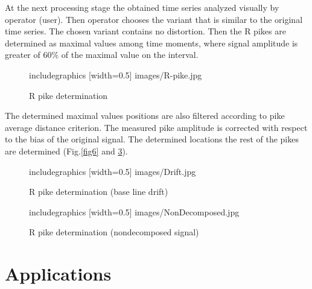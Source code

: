 \documentclass[runningheads]{AIIT}
\begin{document}
At the next processing stage the obtained time series analyzed visually by operator (user).  Then operator chooses the variant that is similar to the original time series.  The chosen variant contains no distortion.  Then the R pikes are determined as maximal values among time moments, where signal amplitude is greater of 60\% of the maximal value on the interval.

\begin{figure}[htb]
  \centering
    includegraphics [width=0.5\linewidth] {images/R-pike.jpg}
  \caption{R pike determination}
  \label{fig:determ-R}
\end{figure}
The determined maximal values positions are also filtered according to pike average distance criterion.  The measured pike amplitude is corrected with respect to the bias of the original signal.  The determined locations the rest of the pikes are determined (Fig.\ref{fig6} and \ref{fig:fig7}).

\begin{figure}[htb]
  \centering
    includegraphics [width=0.5\linewidth] {images/Drift.jpg}
  \caption{R pike determination (base line drift)}
  \label{fig:fig6}
\end{figure}

\begin{figure}[htb]
  \centering
    includegraphics [width=0.5\linewidth] {images/NonDecomposed.jpg}
  \caption{R pike determination (nondecomposed signal)}
  \label{fig:fig7}
\end{figure}

\section{Applications}
\label{sec:applications}
\end{document}
